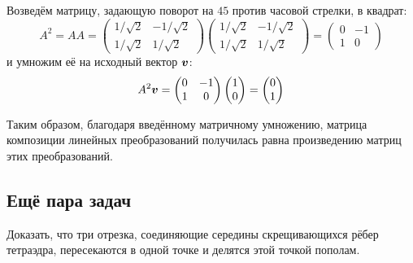 \documentclass[a4paper,12pt]{article}
\begin{document}
  Возведём матрицу, задающую поворот на $45$ против часовой стрелки, в квадрат:
  \[
    A^2
    = A A
    = \begin{pmatrix}
        1/\sqrt{2} & -1/\sqrt{2}\\
        1/\sqrt{2} & 1/\sqrt{2}
      \end{pmatrix}
      \begin{pmatrix}
        1/\sqrt{2} & -1/\sqrt{2}\\
        1/\sqrt{2} & 1/\sqrt{2}
      \end{pmatrix}
    = \begin{pmatrix}
        0 & -1\\
        1 & 0
      \end{pmatrix}
  \]
  и умножим её на исходный вектор $\boldsymbol v$:
  \[
    A^2 \boldsymbol v
    = \begin{pmatrix}
        0 & -1\\
        1 & 0
      \end{pmatrix}
      \begin{pmatrix}
        1 \\ 0
      \end{pmatrix}
    = \begin{pmatrix}
        0 \\ 1
      \end{pmatrix}
  \]
  
  Таким образом, благодаря введённому матричному умножению, матрица композиции линейных преобразований получилась равна произведению матриц этих преобразований.
  
  
  \subsection{Ещё пара задач}
  
  \begin{problem}[1.51]
    Доказать, что три отрезка, соединяющие середины скрещивающихся рёбер тетраэдра, пересекаются в одной точке и делятся этой точкой пополам.
  \end{problem}
\end{document}
